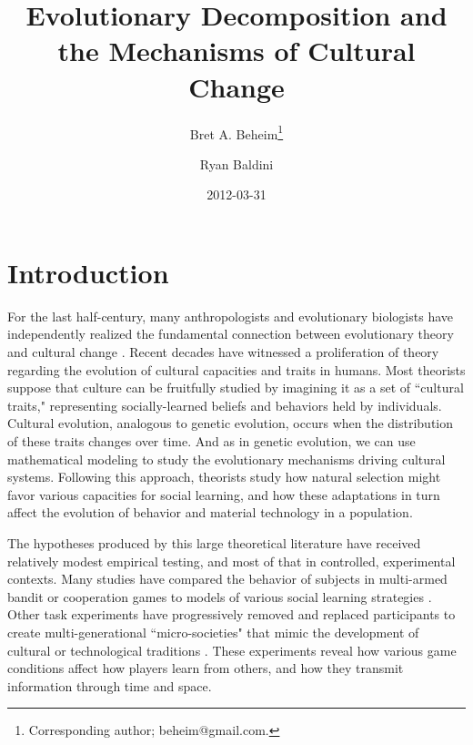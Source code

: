 \documentclass[11pt]{article}
\title{Evolutionary Decomposition and the Mechanisms of Cultural Change}
\author[,    1]{Bret A. Beheim\footnote{Corresponding author; beheim@gmail.com.}}
\author[1]{Ryan Baldini}
\affil[1]{Graduate Group in Ecology, Department of Environmental Science and Policy, University of California, Davis, USA}
\date{2012-03-31}
\begin{document}
\maketitle

\setlength{\parindent}{30pt}
\section{Introduction}
   
For the last half-century, many anthropologists and evolutionary biologists have independently realized the fundamental connection between evolutionary theory and cultural change \citep{campbell1965variation, cavalli1981cultural, boyd1985culture, durham1992coevolution, lumsden2005genes, dawkins2006selfish}. Recent decades have witnessed a proliferation of theory regarding the evolution of cultural capacities and traits in humans. Most theorists suppose that culture can be fruitfully studied by imagining it as a set of ``cultural traits," representing socially-learned beliefs and behaviors held by individuals. Cultural evolution, analogous to genetic evolution, occurs when the distribution of these traits changes over time. And as in genetic evolution, we can use mathematical modeling to study the evolutionary mechanisms driving cultural systems. Following this approach, theorists study how natural selection might favor various capacities for social learning, and how these adaptations in turn affect the evolution of behavior and material technology in a population. 

The hypotheses produced by this large theoretical literature have received relatively modest empirical testing, and most of that in controlled, experimental contexts. Many studies have compared the behavior of subjects in multi-armed bandit or cooperation games to models of various social learning strategies \citep{mcelreath2005applying, efferson2007learning, efferson2008conformists, mcelreath2008beyond, mesoudi2008cultural, eriksson2009people, rendell2011copying}. Other task experiments have progressively removed and replaced participants to create multi-generational ``micro-societies" that mimic the development of cultural or technological traditions \citep{baum2004cultural, caldwell2008studying}.  These experiments reveal how various game conditions affect how players learn from others, and how they transmit information through time and space.
\end{document}
